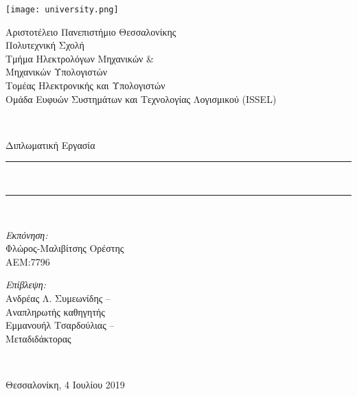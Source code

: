 \begin{titlepage}
    \centering\begin{minipage}{0.3\textwidth}
        \centering\texttt{[image: university.png]}
    \end{minipage}%
    \begin{minipage}{0.7\textwidth}
        \begin{flushleft}
            \large Αριστοτέλειο Πανεπιστήμιο Θεσσαλονίκης\\
            Πολυτεχνική Σχολή\\
            Τμήμα Ηλεκτρολόγων Μηχανικών \&\\Μηχανικών Υπολογιστών\\
            Τομέας Ηλεκτρονικής και Υπολογιστών\\
            Ομάδα Ευφυών Συστημάτων και Τεχνολογίας Λογισμικού (ISSEL)\\[5cm]
        \end{flushleft}
    \end{minipage} \\[1.7cm]

    \begin{center}
        \Large Διπλωματική Εργασία \\[0.8cm]

        \rule{450pt}{4pt} \\[0.4cm]
        \makeatletter{\fontsize{20.26pt}{1em}\selectfont{}\@title{}}\makeatother

        \rule{350pt}{4pt} \\[4cm]

        \noindent\begin{minipage}{0.5\textwidth}
            \begin{flushleft} \large
                \emph{Εκπόνηση:} \\
                Φλώρος-Μαλιβίτσης Ορέστης\\ΑΕΜ:7796\\
            \end{flushleft}
        \end{minipage}\hfill%
        \begin{minipage}{0.5\textwidth}
            \begin{flushright} \large
                \emph{Επίβλεψη:} \\
                Ανδρέας Λ. Συμεωνίδης --\\ Αναπληρωτής καθηγητής\\
                Εμμανουήλ Τσαρδούλιας --\\ Μεταδιδάκτορας
            \end{flushright}
        \end{minipage}
        \\[1cm]
        \vfill

        \large Θεσσαλονίκη, 4 Ιουλίου 2019
    \end{center}
\end{titlepage}

